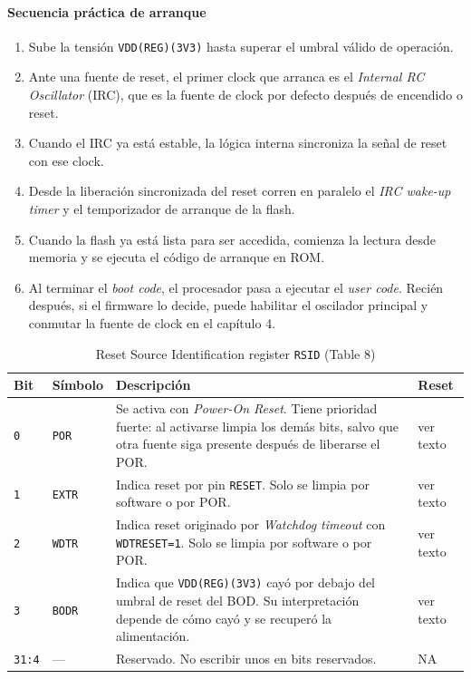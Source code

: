 \paragraph{Secuencia pr\'actica de arranque}
\begin{enumerate}
  \item Sube la tensi\'on \texttt{VDD(REG)(3V3)} hasta superar el umbral v\'alido de operaci\'on.
  \item Ante una fuente de reset, el primer clock que arranca es el \textit{Internal RC Oscillator} (IRC), que es la fuente de clock por defecto despu\'es de encendido o reset.
  \item Cuando el IRC ya est\'a estable, la l\'ogica interna sincroniza la se\~nal de reset con ese clock.
  \item Desde la liberaci\'on sincronizada del reset corren en paralelo el \textit{IRC wake-up timer} y el temporizador de arranque de la flash.
  \item Cuando la flash ya est\'a lista para ser accedida, comienza la lectura desde memoria y se ejecuta el c\'odigo de arranque en ROM.
  \item Al terminar el \textit{boot code}, el procesador pasa a ejecutar el \textit{user code}. Reci\'en despu\'es, si el firmware lo decide, puede habilitar el oscilador principal y conmutar la fuente de clock en el cap\'itulo 4.
\end{enumerate}

\begin{table}[H]
  \centering
  \small
  \renewcommand{\arraystretch}{1.15}
  \caption{Reset Source Identification register \texttt{RSID} (Table 8)}
  \begin{tabularx}{0.96\textwidth}{|>{\centering\arraybackslash}p{}|>{\raggedright\arraybackslash}p{}|>{\raggedright\arraybackslash}X|>{\centering\arraybackslash}p{}|}
    \hline
    \textbf{Bit} & \textbf{S\'imbolo} & \textbf{Descripci\'on} & \textbf{Reset} \\
    \hline
    \texttt{0} & \texttt{POR} & Se activa con \textit{Power-On Reset}. Tiene prioridad fuerte: al activarse limpia los dem\'as bits, salvo que otra fuente siga presente despu\'es de liberarse el POR. & ver texto \\
    \hline
    \texttt{1} & \texttt{EXTR} & Indica reset por pin \texttt{RESET}. Solo se limpia por software o por POR. & ver texto \\
    \hline
    \texttt{2} & \texttt{WDTR} & Indica reset originado por \textit{Watchdog timeout} con \texttt{WDTRESET=1}. Solo se limpia por software o por POR. & ver texto \\
    \hline
    \texttt{3} & \texttt{BODR} & Indica que \texttt{VDD(REG)(3V3)} cay\'o por debajo del umbral de reset del BOD. Su interpretaci\'on depende de c\'omo cay\'o y se recuper\'o la alimentaci\'on. & ver texto \\
    \hline
    \texttt{31:4} & --- & Reservado. No escribir unos en bits reservados. & NA \\
    \hline
  \end{tabularx}
\end{table}

